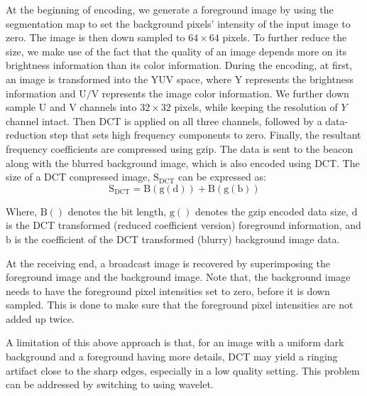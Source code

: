 At the beginning of encoding, we generate a foreground image by using the segmentation map to set the background pixels' intensity of the input image to zero. The image is then down sampled to $64 \times 64$ pixels. To further reduce the size, we make use of the fact that the quality of an image depends more on its brightness information than its color information. During the encoding, at first, an image is transformed into the $\mathrm{YUV}$ space, where $\mathrm{Y}$ represents the brightness information and $\mathrm{U/V}$ represents the image color information. We further down sample $\mathrm{U}$ and $\mathrm{V}$ channels into $32 \times 32$ pixels, while keeping the resolution of $Y$ channel intact. Then DCT is applied on all three channels,  followed by a data-reduction step that sets high frequency components to zero. Finally, the resultant frequency coefficients are compressed using gzip. The data is sent to the beacon along with the blurred background image, which is also encoded using DCT. The size of a DCT compressed image, $\mathrm{S_{DCT}}$ can be expressed as:
\begin{equation}
\mathrm{
S_{DCT} = B(g(d)) + B(g(b))}
\end{equation}

Where, $\mathrm{B()}$ denotes the bit length, $\mathrm{g()}$ denotes the gzip encoded data size, $\mathrm{d}$ is the DCT transformed (reduced coefficient version) foreground information, and $\mathrm{b}$ is the coefficient of the DCT transformed (blurry) background image data.

At the receiving end, a broadcast image is recovered by superimposing the foreground image and the background image. Note that, the background image needs to have the foreground pixel intensities set to zero, before it is down sampled. This is done to make sure that the foreground pixel intensities are not added up twice.



A limitation of this above approach is that, for an image with a uniform dark background and a foreground having more details, DCT may yield a ringing artifact close to the sharp edges, especially in a low quality setting. This problem can be addressed by switching to using wavelet.


